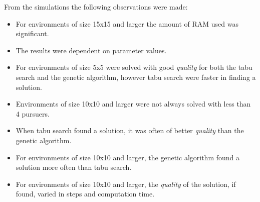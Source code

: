 \pagebreak
From the simulations the following observations were made:
\begin{itemize}
\item{For environments of size 15x15 and larger the amount of RAM used was significant.}
\item{The results were dependent on parameter values.}
\item{For environments of size 5x5 were solved with good \emph{quality} for both the tabu search and the genetic algorithm, however tabu search were faster in finding a solution.}
\item{Environments of size 10x10 and larger were not always solved with less than 4 pursuers.}
\item{When tabu search found a solution, it was often of better \emph{quality} than the genetic algorithm.}
\item{For environments of size 10x10 and larger, the genetic algorithm found a solution more often than tabu search.}
\item{For environments of size 10x10 and larger, the \emph{quality} of the solution, if found, varied in steps and computation time.}
\end{itemize}
